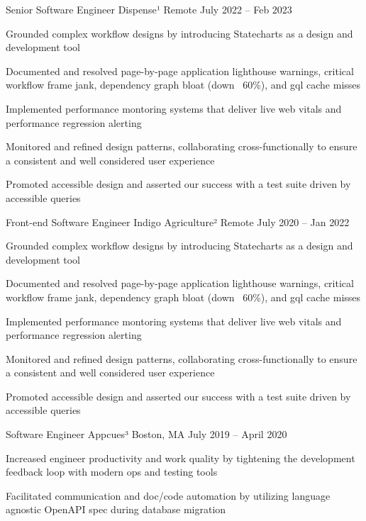 \documentclass[]{awesome-cv}
\begin{document}
\begin{cventries}
	\cventry
	{Senior Software Engineer}
	{Dispense¹}
	{Remote}
	{July 2022 – Feb 2023}
	{\begin{cvitems}
		\item {Grounded complex workflow designs by introducing Statecharts as a design and development tool}
		\item {Documented and resolved page-by-page application lighthouse warnings, critical workflow frame jank, dependency graph bloat (down ~60\%), and gql cache misses}
		\item {Implemented performance montoring systems that deliver live web vitals and performance regression alerting}
		\item {Monitored and refined design patterns, collaborating cross-functionally to ensure a consistent and well considered user experience}
		\item {Promoted accessible design and asserted our success with a test suite driven by accessible queries}
		\end{cvitems}}	
	\cventry
	{Front-end Software Engineer}
	{Indigo Agriculture²}
	{Remote}
	{July 2020 – Jan 2022}
	{\begin{cvitems}
		\item {Grounded complex workflow designs by introducing Statecharts as a design and development tool}
		\item {Documented and resolved page-by-page application lighthouse warnings, critical workflow frame jank, dependency graph bloat (down ~60\%), and gql cache misses}
		\item {Implemented performance montoring systems that deliver live web vitals and performance regression alerting}
		\item {Monitored and refined design patterns, collaborating cross-functionally to ensure a consistent and well considered user experience}
		\item {Promoted accessible design and asserted our success with a test suite driven by accessible queries}
		\end{cvitems}}	
	\cventry
	{Software Engineer}
	{Appcues³}
	{Boston, MA}
	{July 2019 – April 2020}
	{\begin{cvitems}
		\item {Increased engineer productivity and work quality by tightening the development feedback loop with modern ops and testing tools}
		\item {Facilitated communication and doc/code automation by utilizing language agnostic OpenAPI spec during database migration}

\end{cvitems}}
\end{cventries}
\end{document}
